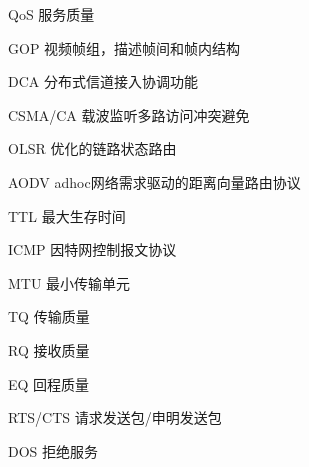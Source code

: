 \begin{denotation}[3cm]
\item[QoS] 服务质量
\item[GOP] 视频帧组，描述帧间和帧内结构
\item[DCA] 分布式信道接入协调功能
\item[CSMA/CA] 载波监听多路访问冲突避免
\item[OLSR] 优化的链路状态路由
\item[AODV] adhoc网络需求驱动的距离向量路由协议
\item[TTL] 最大生存时间
\item[ICMP] 因特网控制报文协议
\item[MTU] 最小传输单元
\item[TQ] 传输质量
\item[RQ] 接收质量
\item[EQ] 回程质量
\item[RTS/CTS] 请求发送包/申明发送包
\item[DOS] 拒绝服务
\end{denotation}
